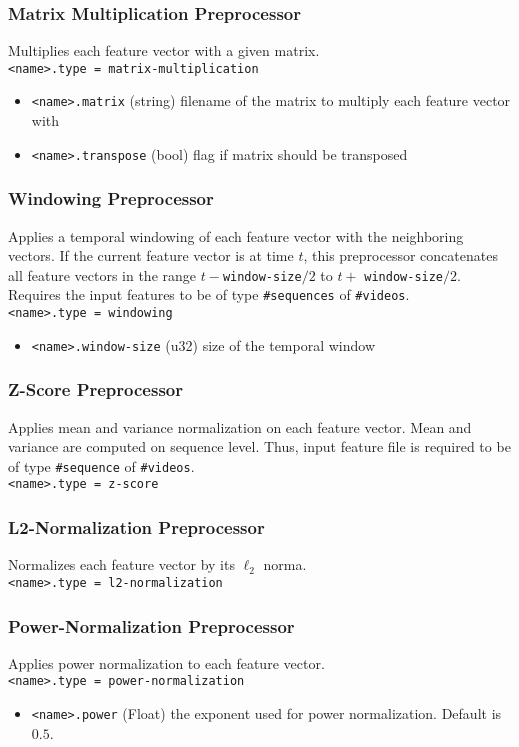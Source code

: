 \subsubsection*{Matrix Multiplication Preprocessor}
Multiplies each feature vector with a given matrix.\\
\texttt{<name>.type = matrix-multiplication}
\begin{itemize}
    \item \texttt{<name>.matrix} (string) filename of the matrix to multiply each feature vector with
    \item \texttt{<name>.transpose} (bool) flag if matrix should be transposed
\end{itemize}

\subsubsection*{Windowing Preprocessor}
Applies a temporal windowing of each feature vector with the neighboring vectors. If the current feature vector is at time $ t $, this preprocessor concatenates all feature vectors in the range $ t - $\texttt{window-size}$ / 2 $ to $ t + $ \texttt{window-size}$ / 2 $. Requires the input features to be of type \texttt{\#sequences} of \texttt{\#videos}.\\
\texttt{<name>.type = windowing}
\begin{itemize}
    \item \texttt{<name>.window-size} (u32) size of the temporal window
\end{itemize}

\subsubsection*{Z-Score Preprocessor}
Applies mean and variance normalization on each feature vector. Mean and variance are computed on sequence level. Thus, input feature file is required to be of type \texttt{\#sequence} of \texttt{\#videos}.\\
\texttt{<name>.type = z-score}

\subsubsection*{L2-Normalization Preprocessor}
Normalizes each feature vector by its $ \ell_2 $ norma.\\
\texttt{<name>.type = l2-normalization}

\subsubsection*{Power-Normalization Preprocessor}
Applies power normalization to each feature vector.\\
\texttt{<name>.type = power-normalization}
\begin{itemize}
    \item \texttt{<name>.power} (Float) the exponent used for power normalization. Default is $ 0.5 $.
\end{itemize}

